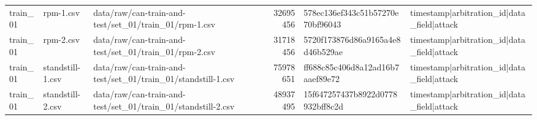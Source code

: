 \begin{tabular}{lllrll}
train\_01 & rpm-1.csv & data/raw/can-train-and-test/set\_01/train\_01/rpm-1.csv & 32695456 & 578ec136ef343c51b57270e70bf96043 & timestamp|arbitration\_id|data\_field|attack \\
train\_01 & rpm-2.csv & data/raw/can-train-and-test/set\_01/train\_01/rpm-2.csv & 31718456 & 5720f173876d86a9165a4e8d46b529ae & timestamp|arbitration\_id|data\_field|attack \\
train\_01 & standstill-1.csv & data/raw/can-train-and-test/set\_01/train\_01/standstill-1.csv & 75978651 & ff688c85c406d8a12ad16b7aaef89e72 & timestamp|arbitration\_id|data\_field|attack \\
train\_01 & standstill-2.csv & data/raw/can-train-and-test/set\_01/train\_01/standstill-2.csv & 48937495 & 15f647257437b8922d0778932bff8c2d & timestamp|arbitration\_id|data\_field|attack \\
\bottomrule
\end{tabular}
